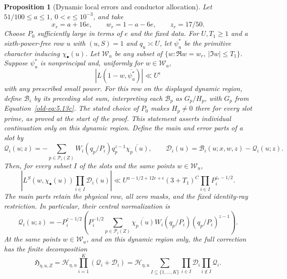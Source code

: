 \documentclass[12pt]{article}
\newtheorem{proposition}[theorem]{Proposition}
\begin{document}
\begin{proposition}[Dynamic local errors and conductor allocation]
\label{prop:probe-errors}
Let $51/100\le a\le1$, $0<e\le10^{-3}$, and take
\[
 x_r=a+16e,\qquad w_r=1-a-6e,\qquad z_r=17/50.
\]
Choose $P_0$ sufficiently large in terms of $e$ and the fixed data.
For $U,T_1\ge1$ and a sixth-power-free row $u$ with $(u,S)=1$
and $q_u\asymp U$, let $\psi_u^*$
be the primitive character inducing $\chi_\bullet(u)$.  Let
$\mathcal W_u$ be any subset of
$\{w:\Re w=w_r,\ |\Im w|\le T_1\}$.  Suppose $\psi_u^*$ is
nonprincipal and, uniformly for $w\in\mathcal W_u$,
\[
 |L(1-w,\overline{\psi_u^*})|\ll U^\epsilon
\]
with any prescribed small power.
For this row on the displayed dynamic region, define \(\mathcal B_i\) by
its preceding slot sum, interpreting each \(\mathcal B_p\) as \(G_p/H_p\),
with \(G_p\) from Equation~\eqref{old-eq:5.13c}.  The stated choice of
\(P_0\) makes \(H_p\ne0\) there for every slot prime, as proved at the start
of the proof.  This statement asserts individual continuation only on this
dynamic region.
Define the main and error parts of a slot by
\[
 \mathcal Q_i(u;z)=
       -\sum_{p\in\mathcal P_i(Z)}W_i(q_p/P_i)q_p^{z-1}\overline{\chi_p(u)},
 \qquad
 \mathcal D_i(u)=\mathcal B_i(u;x,w,z)-\mathcal Q_i(u;z).
\]
Then, for every subset $I$ of the slots and the same points $w\in\mathcal W_u$,
\begin{equation}\label{old-eq:5.13e}
 \left|L^S(w,\chi_\bullet(u))\prod_{i\in I}\mathcal D_i(u)\right|
 \ll U^{a-1/2+12e+\epsilon}(3+T_1)^C
       \prod_{i\in I}P_i^{z_r-1/2}.
\end{equation}
The main parts retain the physical row, all zero masks, and the
fixed identity-ray restriction.  In particular, their central
normalization is
\[
 \mathcal Q_i(u;z)=-P_i^{z-1/2}
       \left(P_i^{-1/2}\sum_{p\in\mathcal P_i(Z)}
          \overline{\chi_p(u)}W_i(q_p/P_i)(q_p/P_i)^{z-1}\right).
\]
At the same points $w\in\mathcal W_u$, and on this dynamic region only, the
full correction has the finite decomposition
\begin{equation}\label{eq:dynamic-compensated-decomposition}
 \mathfrak H_{\eta,u,Z}
 =\mathcal H_{\eta,u}\prod_{i=1}^K(\mathcal Q_i+\mathcal D_i)
 =\mathcal H_{\eta,u}
   \sum_{I\subseteq\{1,\ldots,K\}}
       \prod_{i\in I}\mathcal D_i\prod_{i\notin I}\mathcal Q_i.
\end{equation}
\end{proposition}
\end{document}
